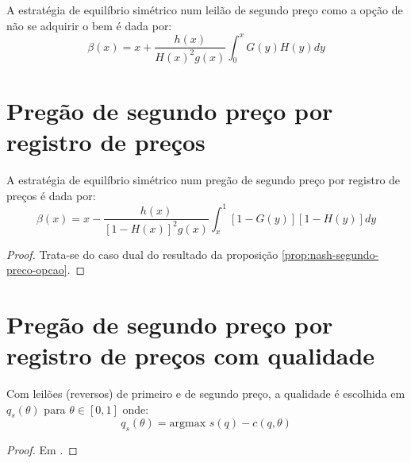 \begin{proposicao}
	\label{prop:nash-segundo-preco-opcao}
	A estratégia de equilíbrio simétrico num leilão de segundo preço como a opção de não se adquirir o bem é dada por:
	\begin{equation}
		\beta(x) = x + \frac{h(x)}{H(x)^2 g(x)} \int_0^x G(y)H(y)dy
	\end{equation}
\end{proposicao}

\section{Pregão de segundo preço por registro de preços}

\begin{proposicao}
	\label{prop:nash-pregao-segundo-preco-rp}
	A estratégia de equilíbrio simétrico num pregão de segundo preço por registro de preços é dada por:
	\begin{equation}
		\beta(x) = x - \frac{h(x)}{[1-H(x)]^2 g(x)} \int_x^1 [1-G(y)][1-H(y)]dy
	\end{equation}
\end{proposicao}
\begin{proof}
	Trata-se do caso dual do resultado da proposição \ref{prop:nash-segundo-preco-opcao}.
\end{proof}

\section{Pregão de segundo preço por registro de preços com qualidade}

\begin{lema}
	Com leilões (reversos) de primeiro e de segundo preço, a qualidade é escolhida em $q_s(\theta)$ para $\theta \in [0, 1]$ onde:
	\begin{equation}
		q_s(\theta) = \text{argmax } s(q) - c(q, \theta)
	\end{equation}
	\begin{proof}
		Em \citet{Che1993}.
	\end{proof}
\end{lema}